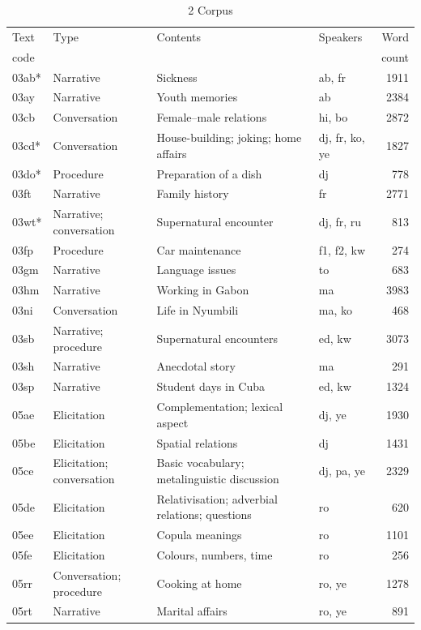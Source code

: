 \begin{longtable}{l >{\raggedright}p{2.1cm} >{\raggedright}p{4.5cm} lr}
\caption{2 Corpus}\label{tab:key:1.2}\\
\lsptoprule

Text & Type & Contents & Speakers & Word\\
code & & & & count\\
\midrule
\endhead
03ab* & Narrative & Sickness & ab, fr & 1911\\
03ay & Narrative & Youth memories & ab & 2384\\
03cb & Conversation & Female–male relations & hi, bo & 2872\\
03cd* & Conversation & House-building; joking; home affairs & dj, fr, ko, ye & 1827\\
03do* & Procedure & Preparation of a dish & dj & 778\\
03ft & Narrative & Family history & fr & 2771\\
03wt* & Narrative; conversation & Supernatural encounter & dj, fr, ru & 813\\
03fp & Procedure & Car maintenance & f1, f2, kw & 274\\
03gm & Narrative & Language issues & to & 683\\
03hm & Narrative & Working in Gabon & ma & 3983\\
03ni & Conversation & Life in Nyumbili & ma, ko & 468\\
03sb & Narrative; procedure & Supernatural encounters & ed, kw & 3073\\
03sh & Narrative & Anecdotal story & ma & 291\\
03sp & Narrative & Student days in Cuba & ed, kw & 1324\\
05ae & Elicitation & Complementation; lexical aspect & dj, ye & 1930\\
05be & Elicitation & Spatial relations & dj & 1431\\
05ce & Elicitation; conversation & Basic vocabulary; metalinguistic discussion & dj, pa, ye & 2329\\
05de & Elicitation & Relativisation; adverbial relations; questions & ro & 620\\
05ee & Elicitation & Copula meanings & ro & 1101\\
05fe & Elicitation & Colours, numbers, time & ro & 256\\
05rr & Conversation; procedure & Cooking at home & ro, ye & 1278\\
05rt & Narrative & Marital affairs & ro, ye & 891\\

\end{longtable}
